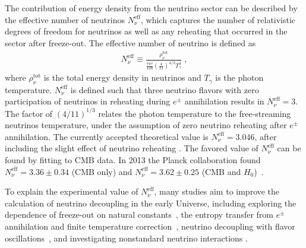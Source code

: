 The contribution of energy density from the neutrino sector can be described by the effective number of neutrinos $N_{\nu}^{\mathrm{eff}}$, which captures the number of relativistic degrees of freedom for neutrinos as well as any reheating that occurred in the sector after freeze-out. The effective number of neutrino is defined as 
\begin{align}\label{Neff}
N_\nu^{\mathrm{eff}}\equiv\frac{\rho^{\mathrm{tot}}_\nu}{\frac{7\pi^2}{120}\left(\frac{4}{11}\right)^{4/3}T_\gamma^4}\;,
\end{align}
where $\rho_\nu^{\mathrm{tot}}$ is the total energy density in neutrinos and $T_\gamma$ is the photon temperature. $N_\nu^{\mathrm{eff}}$ is defined such that three neutrino flavors with zero participation of neutrinos in reheating during $e^\pm$ annihilation results in $N_\nu^{\mathrm{eff}}=3$. The factor of $\left(4/11\right)^{1/3}$ relates the photon temperature to the free-streaming neutrinos temperature, under the assumption of zero neutrino reheating after $e^\pm$ annihilation. The currently accepted theoretical value is $N_\nu^{\mathrm{eff}}=3.046$, after including the slight effect of neutrino reheating \cite{Mangano:2005cc,Birrell:2014uka}. The favored value of $N_\nu^{\mathrm{eff}}$ can be found by fitting to CMB data. In 2013 the Planck collaboration found $N_\nu^{\mathrm{eff}}=3.36\pm0.34$ (CMB only) and $N_\nu^{\mathrm{eff}}= 3.62\pm0.25$ (CMB and $H_0$)~\cite{Planck:2013pxb}.

To explain the experimental value of $N_\nu^{\mathrm{eff}}$, many studies aim to improve the calculation of neutrino decoupling in the early Universe, including exploring the dependence of freeze-out on natural constants~\cite{Birrell:2014uka}, the entropy transfer from $e^\pm$ annihilation and finite temperature correction~\cite{Dicus:1982bz,Heckler:1994tv,Fornengo:1997wa}, neutrino decoupling with flavor oscillations~\cite{Mangano:2001iu,Mangano:2005cc}, and investigating nonstandard neutrino interactions \cite{Morgan:1981zy,Fukugita:1987uy,Elmfors:1997tt,Vogel:1989iv,Mangano:2006ar,Giunti:2008ve,Mangano:2006ar}.%


